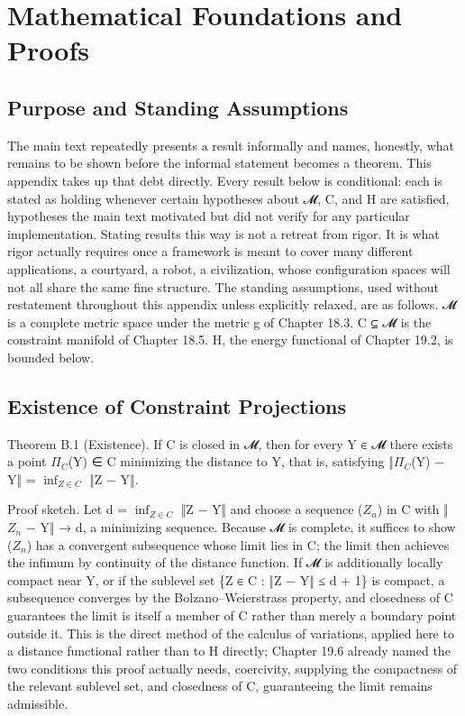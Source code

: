 \chapter{Mathematical Foundations and Proofs}

\section{Purpose and Standing Assumptions}

The main text repeatedly presents a result informally and names, honestly, what remains to be shown before the informal statement becomes a theorem. This appendix takes up that debt directly. Every result below is conditional: each is stated as holding whenever certain hypotheses about 𝓜, C, and H are satisfied, hypotheses the main text motivated but did not verify for any particular implementation. Stating results this way is not a retreat from rigor. It is what rigor actually requires once a framework is meant to cover many different applications, a courtyard, a robot, a civilization, whose configuration spaces will not all share the same fine structure. The standing assumptions, used without restatement throughout this appendix unless explicitly relaxed, are as follows. 𝓜 is a complete metric space under the metric g of Chapter 18.3. C ⊆ 𝓜 is the constraint manifold of Chapter 18.5. H, the energy functional of Chapter 19.2, is bounded below.

\section{Existence of Constraint Projections}

Theorem B.1 (Existence). If C is closed in 𝓜, then for every Y ∈ 𝓜 there exists a point \(\Pi_C\)(Y) ∈ C minimizing the distance to Y, that is, satisfying ‖\(\Pi_C\)(Y) − Y‖ = \(\inf_{Z \in C}\) ‖Z − Y‖.

Proof sketch. Let d = \(\inf_{Z \in C}\) ‖Z − Y‖ and choose a sequence (\(Z_n\)) in C with ‖\(Z_n\) − Y‖ → d, a minimizing sequence. Because 𝓜 is complete, it suffices to show (\(Z_n\)) has a convergent subsequence whose limit lies in C; the limit then achieves the infimum by continuity of the distance function. If 𝓜 is additionally locally compact near Y, or if the sublevel set \{Z ∈ C : ‖Z − Y‖ ≤ d + 1\} is compact, a subsequence converges by the Bolzano–Weierstrass property, and closedness of C guarantees the limit is itself a member of C rather than merely a boundary point outside it. This is the direct method of the calculus of variations, applied here to a distance functional rather than to H directly; Chapter 19.6 already named the two conditions this proof actually needs, coercivity, supplying the compactness of the relevant sublevel set, and closedness of C, guaranteeing the limit remains admissible.

